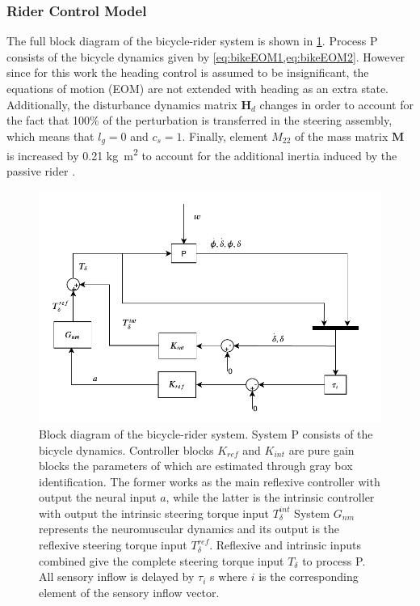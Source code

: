 \subsubsection{Rider Control Model}
The full block diagram of the bicycle-rider system is shown in \cref{fig:intrinsic_block}. Process P consists of the bicycle dynamics given by \cref{eq:bikeEOM1,eq:bikeEOM2}. However since for this work the heading control is assumed to be insignificant, the equations of motion (EOM) are not extended with heading as an extra state. Additionally, the disturbance dynamics matrix \ensuremath{\boldsymbol{H}_d} changes in order to account for the fact that 100\% of the perturbation is transferred in the steering assembly, which means that \ensuremath{l_g=0} and \ensuremath{c_s=1}. Finally, element \ensuremath{{{M}}_{22}} of the mass matrix \ensuremath{\boldsymbol{M}} is increased by 0.21 \si{\kilogram.m^2} to account for the additional inertia induced by the passive rider \cite{schwab2012lateral}. 
\begin{figure}[h!]
    \centering
 
    \includegraphics[width=\linewidth]{images/steer_irf/steering_block.pdf}
    \caption{Block diagram of the bicycle-rider system. System P consists of the bicycle dynamics. Controller blocks \ensuremath{K_{ref}} and \ensuremath{K_{int}} are pure gain blocks the parameters of which are estimated through gray box identification. The former works as the main reflexive controller with output the neural input \ensuremath{a}, while the latter is the intrinsic controller with output the intrinsic steering torque input \ensuremath{T^{int}_{\delta}} System \ensuremath{G_{nm}} represents the neuromuscular dynamics and its output is the reflexive steering torque input \ensuremath{T^{ref}_{\delta}}. Reflexive and intrinsic inputs combined give the complete steering torque input \ensuremath{T_\delta} to process P. All sensory inflow is delayed by \ensuremath{\tau_i} \si{\second} where \ensuremath{i} is the corresponding element of the sensory inflow vector.  }
    \label{fig:intrinsic_block}
\end{figure}
